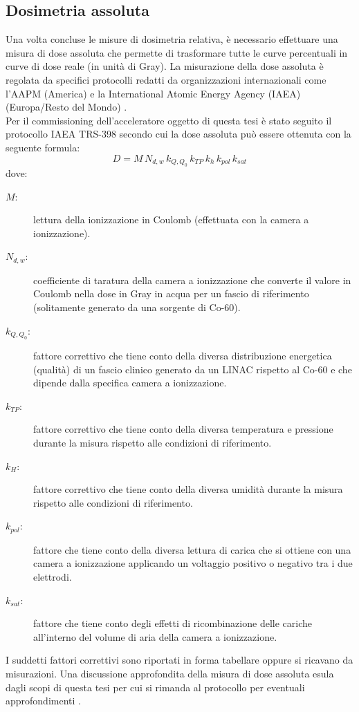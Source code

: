 \subsection{Dosimetria assoluta}
\label{sec:dose_ass}
Una volta concluse le misure di dosimetria relativa, è necessario effettuare una misura di dose assoluta che permette di trasformare tutte le curve percentuali in curve di dose reale (in unità di Gray). La misurazione della dose assoluta è regolata da specifici protocolli redatti da organizzazioni internazionali come l'AAPM (America) \cite{Almond1999} e la International Atomic Energy Agency (IAEA) (Europa/Resto del Mondo) \cite{Andreo2006}.\\
Per il commissioning dell'acceleratore oggetto di questa tesi è stato seguito il protocollo IAEA TRS-398 secondo cui la dose assoluta può essere ottenuta con la seguente formula:
\begin{equation}
D = M\,N_{d,w}\,k_{Q,Q_0}\,k_{TP}\,k_h\,k_{pol}\,k_{sat}
\end{equation}
dove:
\begin{description}
\item[$M:$] lettura della ionizzazione in Coulomb (effettuata con la camera a ionizzazione).
\item[$N_{d,w}:$] coefficiente di taratura della camera a ionizzazione che converte il valore in Coulomb nella dose in Gray in acqua per un fascio di riferimento (solitamente generato da una sorgente di Co-60).
\item[$k_{Q,Q_0}:$] fattore correttivo che tiene conto della diversa distribuzione energetica (qualità) di un fascio clinico generato da un LINAC rispetto al Co-60 e che dipende dalla specifica camera a ionizzazione.
\item[$k_{TP}:$] fattore correttivo che tiene conto della diversa temperatura e pressione durante la misura rispetto alle condizioni di riferimento.
\item[$k_{H}:$] fattore correttivo che tiene conto della diversa umidità durante la misura rispetto alle condizioni di riferimento.
\item[$k_{pol}:$] fattore che tiene conto della diversa lettura di carica che si ottiene con una camera a ionizzazione applicando un voltaggio positivo o negativo tra i due elettrodi.
\item[$k_{sat}:$] fattore che tiene conto degli effetti di ricombinazione delle cariche all'interno del volume di aria della camera a ionizzazione.
\end{description}
I suddetti fattori correttivi sono riportati in forma tabellare oppure si ricavano da misurazioni. Una discussione approfondita della misura di dose assoluta esula dagli scopi di questa tesi per cui si rimanda al protocollo per eventuali approfondimenti \cite{Andreo2006}.


